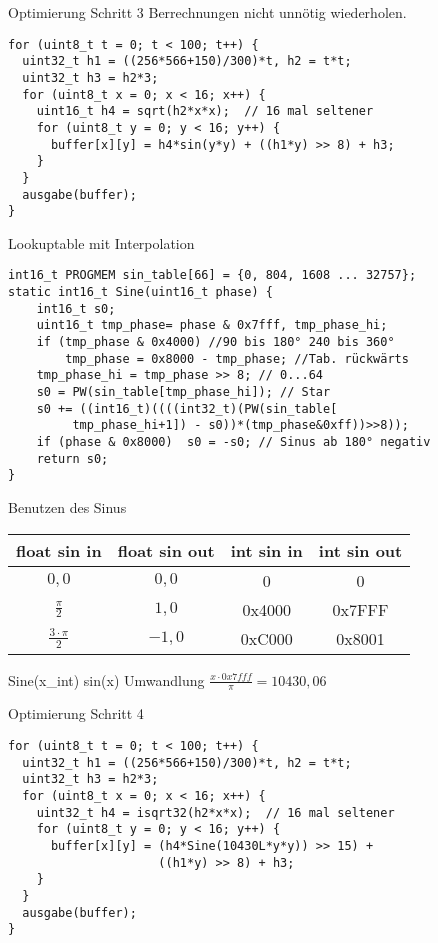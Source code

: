 \documentclass{beamer}
\begin{document}
\begin{frame}[fragile]{Optimierung Schritt 3}
Berrechnungen nicht unnötig wiederholen.
\begin{verbatim}
for (uint8_t t = 0; t < 100; t++) {
  uint32_t h1 = ((256*566+150)/300)*t, h2 = t*t; 
  uint32_t h3 = h2*3; 
  for (uint8_t x = 0; x < 16; x++) {
    uint16_t h4 = sqrt(h2*x*x);  // 16 mal seltener
    for (uint8_t y = 0; y < 16; y++) {
      buffer[x][y] = h4*sin(y*y) + ((h1*y) >> 8) + h3;
    }
  }
  ausgabe(buffer);
}
\end{verbatim}
\end{frame}

\begin{frame}[fragile]{Lookuptable mit Interpolation}
\begin{verbatim}
int16_t PROGMEM sin_table[66] = {0, 804, 1608 ... 32757};
static int16_t Sine(uint16_t phase) {
    int16_t s0;
    uint16_t tmp_phase= phase & 0x7fff, tmp_phase_hi;
    if (tmp_phase & 0x4000) //90 bis 180° 240 bis 360° 
        tmp_phase = 0x8000 - tmp_phase; //Tab. rückwärts
    tmp_phase_hi = tmp_phase >> 8; // 0...64
    s0 = PW(sin_table[tmp_phase_hi]); // Star
    s0 += ((int16_t)((((int32_t)(PW(sin_table[
         tmp_phase_hi+1]) - s0))*(tmp_phase&0xff))>>8));
    if (phase & 0x8000)  s0 = -s0; // Sinus ab 180° negativ
    return s0;
}
\end{verbatim}
\end{frame}

\begin{frame}[fragile]{Benutzen des Sinus}
\begin{tabular}[c] {cccc}
float sin in 	& float sin out  & int sin in & int sin out \\
\hline
$0,0$		& $0,0$	        & 0        & 0 \\
$\frac{\pi}{2}$&$1,0$	        & 0x4000   & 0x7FFF \\
$\frac{3\cdot\pi}{2}$&$-1,0$   & 0xC000   & 0x8001 \\
\end{tabular}
Sine(x\_int)   sin(x)
Umwandlung $ \frac{x \cdot 0x7fff}{\pi} = 10430,06 $ 
\end{frame}

\begin{frame}[fragile]{Optimierung Schritt 4}
\begin{verbatim}
for (uint8_t t = 0; t < 100; t++) {
  uint32_t h1 = ((256*566+150)/300)*t, h2 = t*t; 
  uint32_t h3 = h2*3; 
  for (uint8_t x = 0; x < 16; x++) {
    uint32_t h4 = isqrt32(h2*x*x);  // 16 mal seltener
    for (uint8_t y = 0; y < 16; y++) {
      buffer[x][y] = (h4*Sine(10430L*y*y)) >> 15) + 
                     ((h1*y) >> 8) + h3;
    }
  }
  ausgabe(buffer);
}
\end{verbatim}
\end{frame}
\end{document}

